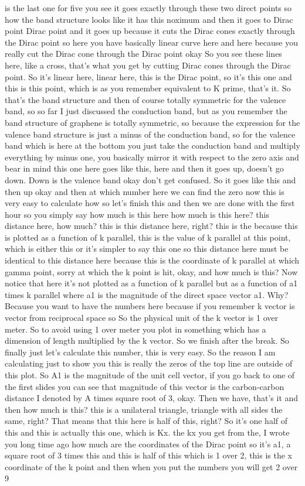 is the last one for five you see it goes exactly through these two direct points so how the band structure looks like it has this noximum and then it goes to Dirac point Dirac point and it goes up because it cuts the Dirac cones exactly through the Dirac point so here you have basically linear curve here and here because you really cut the Dirac cone through the Dirac point okay So you see these lines here, like a cross, that's what you get by cutting Dirac cones through the Dirac point. So it's linear here, linear here, this is the Dirac point, so it's this one and this is this point, which is as you remember equivalent to K prime, that's it. So that's the band structure and then of course totally symmetric for the valence band, so so far I just discussed the conduction band, but as you remember the band structure of graphene is totally symmetric, so because the expression for the valence band structure is just a minus of the conduction band, so for the valence band which is here at the bottom you just take the conduction band and multiply everything by minus one, you basically mirror it with respect to the zero axis and bear in mind this one here goes like this, here and then it goes up, doesn't go down. Down is the valence band okay don't get confused. So it goes like this and then up okay and then at which number here we can find the zero now this is very easy to calculate how so let's finish this and then we are done with the first hour so you simply say how much is this here how much is this here? this distance here, how much? this is this distance here, right? this is the because this is plotted as a function of k parallel, this is the value of k parallel at this point, which is either this or it's simpler to say this one so this distance here must be identical to this distance here because this is the coordinate of k parallel at which gamma point, sorry at which the k point is hit, okay, and how much is this? Now notice that here it's not plotted as a function of k parallel but as a function of a1 times k parallel where a1 is the magnitude of the direct space vector a1. Why? Because you want to have the numbers here because if you remember k vector is vector from reciprocal space so So the physical unit of the k vector is 1 over meter. So to avoid using 1 over meter you plot in something which has a dimension of length multiplied by the k vector. So we finish after the break. So finally just let's calculate this number, this is very easy. So the reason I am calculating just to show you this is really the zeros of the top line are outside of this plot. So A1 is the magnitude of the unit cell vector, if you go back to one of the first slides you can see that magnitude of this vector is the carbon-carbon distance I denoted by A times square root of 3, okay. Then we have, that's it and then how much is this? this is a unilateral triangle, triangle with all sides the same, right? That means that this here is half of this, right? So it's one half of this and this is actually this one, which is Kx. the kx you get from the, I wrote you long time ago how much are the coordinates of the Dirac point so it's a1, a square root of 3 times this and this is half of this which is 1 over 2, this is the x coordinate of the k point and then when you put the numbers you will get 2 over 9 